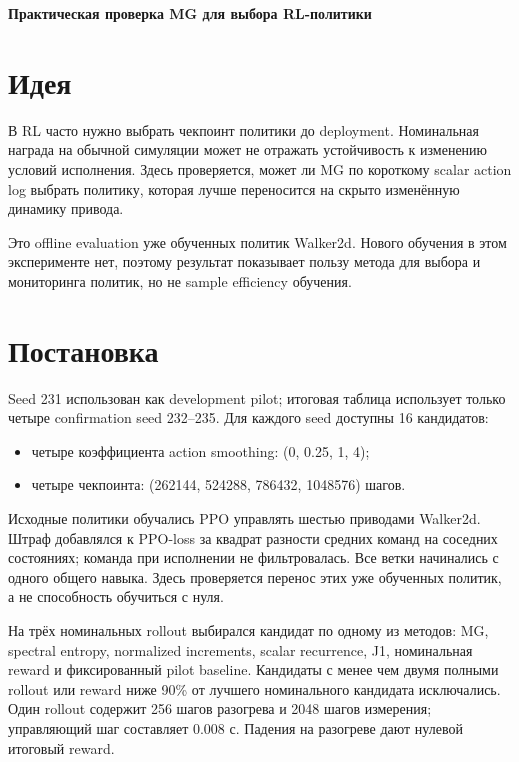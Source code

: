 \documentclass[10pt,a4paper]{article}
\begin{document}
{\Large\bfseries Практическая проверка MG для выбора RL-политики}\par\medskip

\section*{Идея}

В RL часто нужно выбрать чекпоинт политики до deployment. Номинальная награда на обычной симуляции может не отражать устойчивость к изменению условий исполнения. Здесь проверяется, может ли MG по короткому scalar action log выбрать политику, которая лучше переносится на скрыто изменённую динамику привода.

Это offline evaluation уже обученных политик Walker2d. Нового обучения в этом эксперименте нет, поэтому результат показывает пользу метода для выбора и мониторинга политик, но не sample efficiency обучения.

\section*{Постановка}

Seed 231 использован как development pilot; итоговая таблица использует только четыре confirmation seed 232--235. Для каждого seed доступны 16 кандидатов:

\begin{itemize}
\item четыре коэффициента action smoothing: (0, 0.25, 1, 4);
\item четыре чекпоинта: (262144, 524288, 786432, 1048576) шагов.
\end{itemize}

Исходные политики обучались PPO управлять шестью приводами Walker2d. Штраф добавлялся к PPO-loss за квадрат разности средних команд на соседних состояниях; команда при исполнении не фильтровалась. Все ветки начинались с одного общего навыка. Здесь проверяется перенос этих уже обученных политик, а не способность обучиться с нуля.

На трёх номинальных rollout выбирался кандидат по одному из методов: MG, spectral entropy, normalized increments, scalar recurrence, J1, номинальная reward и фиксированный pilot baseline. Кандидаты с менее чем двумя полными rollout или reward ниже 90\% от лучшего номинального кандидата исключались. Один rollout содержит 256 шагов разогрева и 2048 шагов измерения; управляющий шаг составляет 0.008 с. Падения на разогреве дают нулевой итоговый reward.
\end{document}
